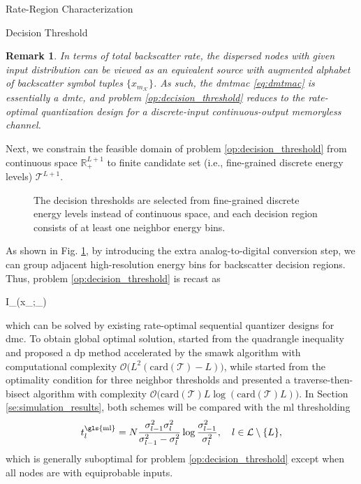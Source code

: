 \documentclass[journal]{IEEEtran}
\newtheorem{remark}{Remark}
\begin{document}
\begin{section}{Rate-Region Characterization}
\begin{subsection}{Decision Threshold}
		\begin{remark}
			In terms of total backscatter rate, the dispersed nodes with given input distribution can be viewed as an equivalent source with augmented alphabet of backscatter symbol tuples $\{x_{m_{\mathcal{K}}}\}$.
			As such, the \gls{dmtmac} \eqref{eq:dmtmac} is essentially a \gls{dmtc}, and problem \eqref{op:decision_threshold} reduces to the rate-optimal quantization design for a discrete-input continuous-output memoryless channel.
			\label{re:augmented_source}
		\end{remark}

		Next, we constrain the feasible domain of problem \eqref{op:decision_threshold} from continuous space $\mathbb{R}_+^{L+1}$ to finite candidate set (i.e., fine-grained discrete energy levels) $\mathcal{T}^{L+1}$.
		\begin{figure}[!t]
			\centering
			\resizebox{0.9\columnwidth}{!}{
				
			}
			\caption{The decision thresholds are selected from fine-grained discrete energy levels instead of continuous space, and each decision region consists of at least one neighbor energy bins.}
			\label{fi:discrete_outputs}
		\end{figure}
		As shown in Fig. \ref{fi:discrete_outputs}, by introducing the extra analog-to-digital conversion step, we can group adjacent high-resolution energy bins for backscatter decision regions.
		Thus, problem \eqref{op:decision_threshold} is recast as
		\begin{maxi!}
			{}{I_{}(x_{};_{})}{\label{op:decision_threshold_discrete}}{\label{ob:decision_threshold_discrete}}
			\addConstraint{\eqref{co:sequential_threshold},}
		\end{maxi!}
		which can be solved by existing rate-optimal sequential quantizer designs for \gls{dmc}.
		To obtain global optimal solution, \cite{He2021} started from the quadrangle inequality and proposed a \gls{dp} method accelerated by the \gls{smawk} algorithm with computational complexity $\mathcal{O}\bigl(L^2(\mathrm{card}(\mathcal{T})-L)\bigr)$, while \cite{Nguyen2020a} started from the optimality condition for three neighbor thresholds and presented a traverse-then-bisect algorithm with complexity $\mathcal{O}\bigl(\mathrm{card}(\mathcal{T})L\log(\mathrm{card}(\mathcal{T})L)\bigr)$.
		In Section \ref{se:simulation_results}, both schemes will be compared with the \gls{ml} thresholding \cite{Qian2019}
		\begin{equation}
			t_{l}^{\mathrm{\gls{ml}}} = N \frac{\sigma_{l-1}^2 \sigma_{l}^2}{\sigma_{l-1}^2 - \sigma_{l}^2} \log \frac{\sigma_{l-1}^2}{\sigma_{l}^2}, \quad l \in \mathcal{L} \setminus \{L\},
			\label{eq:detection_threshold_maximum_likelihood}
		\end{equation}
		which is generally suboptimal for problem \eqref{op:decision_threshold} except when all nodes are with equiprobable inputs.
	\end{subsection}
\end{section}
\end{document}
